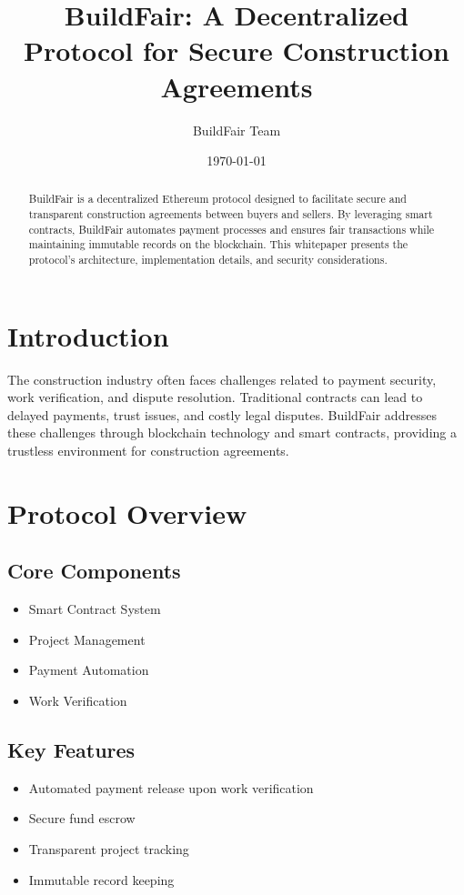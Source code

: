 \documentclass[12pt]{article}
\title{BuildFair: A Decentralized Protocol for Secure Construction Agreements}
\author{BuildFair Team}
\date{\today}
\begin{document}
\maketitle

\begin{abstract}
BuildFair is a decentralized Ethereum protocol designed to facilitate secure and transparent construction agreements between buyers and sellers. By leveraging smart contracts, BuildFair automates payment processes and ensures fair transactions while maintaining immutable records on the blockchain. This whitepaper presents the protocol's architecture, implementation details, and security considerations.
\end{abstract}

\tableofcontents

\section{Introduction}
The construction industry often faces challenges related to payment security, work verification, and dispute resolution. Traditional contracts can lead to delayed payments, trust issues, and costly legal disputes. BuildFair addresses these challenges through blockchain technology and smart contracts, providing a trustless environment for construction agreements.

\section{Protocol Overview}
\subsection{Core Components}
\begin{itemize}
    \item Smart Contract System
    \item Project Management
    \item Payment Automation
    \item Work Verification
\end{itemize}

\subsection{Key Features}
\begin{itemize}
    \item Automated payment release upon work verification
    \item Secure fund escrow
    \item Transparent project tracking
    \item Immutable record keeping
\end{itemize}
\end{document}

